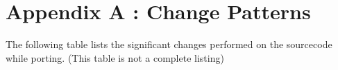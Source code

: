 \section{Appendix A : Change Patterns}\label{sec:change-patterns}

The following table lists the significant changes performed on the sourcecode while porting. (This table is not a complete listing)





